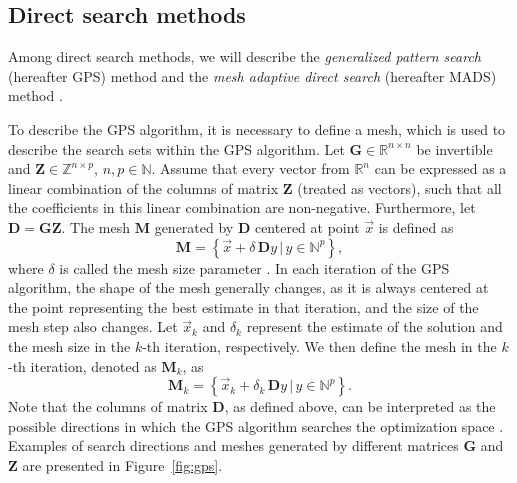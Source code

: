 \subsection{Direct search methods}\label{direct-search}
Among direct search methods, we will describe the \textit{generalized pattern search} (hereafter GPS) method \cite{Audet2002} and the \textit{mesh adaptive direct search} (hereafter MADS) method \cite{Audet2006}.

To describe the GPS algorithm, it is necessary to define a mesh, which is used to describe the search sets within the GPS algorithm. Let $ \mathbf{G} \in \mathbb{R}^{n \times n} $ be invertible and $ \mathbf{Z} \in \mathbb{Z}^{n \times p} $, $n, p \in \mathbb{N}$. Assume that every vector from $ \mathbb{R}^{n} $ can be expressed as a linear combination of the columns of matrix $ \mathbf{Z} $ (treated as vectors), such that all the coefficients in this linear combination are non-negative. Furthermore, let $ \mathbf{D} = \mathbf{G} \mathbf{Z} $. The mesh $ \mathbf{M} $ generated by $ \mathbf{D} $ centered at point $ \vec{x} $ is defined as
\begin{equation}
	\mathbf{M} = \left\{ \vec{x} + \delta \, \mathbf{D} y \, | \, y \in \mathbb{N}^p \right\},
\end{equation}
where $ \delta $ is called the mesh size parameter \cite{BBO-textbook, Audet2002}. In each iteration of the GPS algorithm, the shape of the mesh generally changes, as it is always centered at the point representing the best estimate in that iteration, and the size of the mesh step also changes. Let $ \vec{x}_k $ and $ \delta_k $ represent the estimate of the solution and the mesh size in the $ k $-th iteration, respectively. We 
then define the mesh in the $ k $-th iteration, denoted as $ \mathbf{M} _k $, as
\begin{equation}
	\mathbf{M} _k = \left\{ \vec{x}_k + \delta_k \, \mathbf{D} y \, | \, y \in \mathbb{N}^p \right\}.
\end{equation}
Note that the columns of matrix $ \mathbf{D} $, as defined above, can be interpreted as the possible directions in which the GPS algorithm searches the optimization space \cite{BBO-textbook, Audet2002}. Examples of search directions and meshes generated by different matrices $\mathbf{G}$ and $\mathbf{Z}$ are presented in Figure~\ref{fig:gps}.


